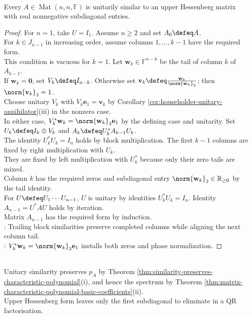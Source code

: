 \begin{theorem} \label{thm:unitary-upper-hessenberg-reduction} \\
Every $A\in\operatorname{Mat}(n,n,\mathbb{F})$ is unitarily similar to an upper Hessenberg matrix with real nonnegative subdiagonal entries.
\begin{proof}
For $n=1$, take $U=I_1$. Assume $n\geq2$ and set $A_0\defeq A$.\\
For $k\in J_{n-1}$ in increasing order, assume columns $1,\ldots,k-1$ have the required form.\\
This condition is vacuous for $k=1$. Let $\mathbf{w}_k\in\mathbb{F}^{n-k}$ be the tail of column $k$ of $A_{k-1}$.\\
If $\mathbf{w}_k=\mathbf{0}$, set $V_k\defeq I_{n-k}$. Otherwise set $\mathbf{v}_k\defeq\frac{\mathbf{w}_k}{\norm{\mathbf{w}_k}_2}$; then $\norm{\mathbf{v}_k}_2=1$.\\
Choose unitary $V_k$ with $V_k\mathbf{e}_1=\mathbf{v}_k$ by Corollary \ref{cor:householder-unitary-annihilator}(iii) in the nonzero case.\\
In either case, $V_k^*\mathbf{w}_k=\norm{\mathbf{w}_k}_2\mathbf{e}_1$ by the defining case and unitarity. Set $U_k\defeq I_k\oplus V_k$ and $A_k\defeq U_k^*A_{k-1}U_k$.\\
The identity $U_k^*U_k=I_n$ holds by block multiplication. The first $k-1$ columns are fixed by right multiplication with $U_k$.\\
They are fixed by left multiplication with $U_k^*$ because only their zero tails are mixed.\\
Column $k$ has the required zeros and subdiagonal entry $\norm{\mathbf{w}_k}_2\in\mathbb{R}_{\geq0}$ by the tail identity.\\
For $U\defeq U_1\cdots U_{n-1}$, $U$ is unitary by identities $U_k^*U_k=I_n$. Identity $A_{n-1}=U^*AU$ holds by iteration.\\
Matrix $A_{n-1}$ has the required form by induction.\\
: Trailing block similarities preserve completed columns while aligning the next column tail.\\
: $V_k^*\mathbf{w}_k=\norm{\mathbf{w}_k}_2\mathbf{e}_1$ installs both zeros and phase normalization.
\end{proof}
\end{theorem}

\begin{perspective} \label{per:hessenberg-before-qr} \\
Unitary similarity preserves $p_A$ by Theorem \ref{thm:similarity-preserves-characteristic-polynomial}(i), and hence the spectrum by Theorem \ref{thm:matrix-characteristic-polynomial-basic-coefficients}(ii).\\
Upper Hessenberg form leaves only the first subdiagonal to eliminate in a QR factorisation.
\end{perspective}

